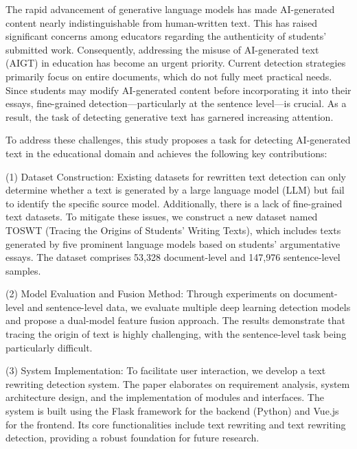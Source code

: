 \begin{abstractEn}
  The rapid advancement of generative language models has made AI-generated content nearly indistinguishable from human-written text. This has raised significant concerns among educators regarding the authenticity of students' submitted work. Consequently, addressing the misuse of AI-generated text (AIGT) in education has become an urgent priority. Current detection strategies primarily focus on entire documents, which do not fully meet practical needs. Since students may modify AI-generated content before incorporating it into their essays, fine-grained detection---particularly at the sentence level---is crucial. As a result, the task of detecting generative text has garnered increasing attention.
  
  To address these challenges, this study proposes a task for detecting AI-generated text in the educational domain and achieves the following key contributions:
  
  (1) Dataset Construction: Existing datasets for rewritten text detection can only determine whether a text is generated by a large language model (LLM) but fail to identify the specific source model. Additionally, there is a lack of fine-grained text datasets. To mitigate these issues, we construct a new dataset named TOSWT (Tracing the Origins of Students' Writing Texts), which includes texts generated by five prominent language models based on students' argumentative essays. The dataset comprises 53,328 document-level and 147,976 sentence-level samples.
  
  (2) Model Evaluation and Fusion Method: Through experiments on document-level and sentence-level data, we evaluate multiple deep learning detection models and propose a dual-model feature fusion approach. The results demonstrate that tracing the origin of text is highly challenging, with the sentence-level task being particularly difficult.
  
  (3) System Implementation: To facilitate user interaction, we develop a text rewriting detection system. The paper elaborates on requirement analysis, system architecture design, and the implementation of modules and interfaces. The system is built using the Flask framework for the backend (Python) and Vue.js for the frontend. Its core functionalities include text rewriting and text rewriting detection, providing a robust foundation for future research.
\end{abstractEn}

